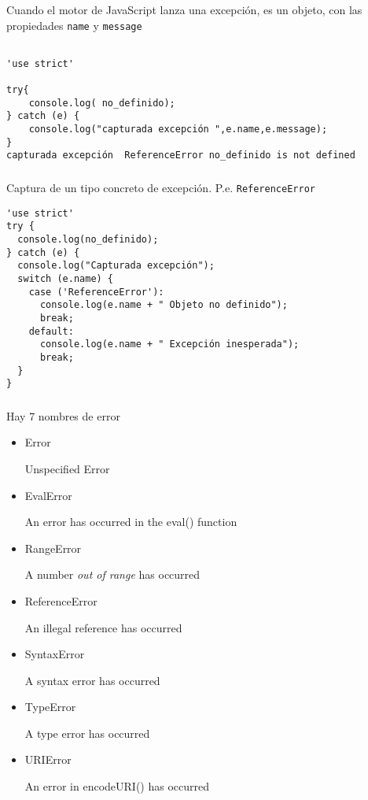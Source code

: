 \documentclass[ucs]{beamer}
\begin{document}
\begin{frame}[fragile]
\frametitle{}
Cuando el motor de JavaScript lanza una excepción, es un objeto,
con las propiedades 
\verb|name| y
\verb|message|

  \begin{scriptsize}
  \begin{verbatim}

'use strict'

try{
    console.log( no_definido);
} catch (e) {
    console.log("capturada excepción ",e.name,e.message);
}
capturada excepción  ReferenceError no_definido is not defined
  \end{verbatim}
  \end{scriptsize}

\end{frame}

\begin{frame}[fragile]
\frametitle{}

Captura de un tipo concreto de excepción. P.e. \verb|ReferenceError|
  \begin{scriptsize}
  \begin{verbatim}
'use strict'
try {
  console.log(no_definido);
} catch (e) {
  console.log("Capturada excepción");
  switch (e.name) {
    case ('ReferenceError'):
      console.log(e.name + " Objeto no definido");
      break;
    default:
      console.log(e.name + " Excepción inesperada");
      break;
  }
}
  \end{verbatim}
  \end{scriptsize}
\end{frame}

\begin{frame}[fragile]
\frametitle{}
Hay 7 nombres de error
    \begin{itemize}
    \item
Error

Unspecified Error
    \item
EvalError	

An error has occurred in the eval() function
    \item
RangeError

A number \emph{out of range} has occurred
    \item
ReferenceError

An illegal reference has occurred
    \item
SyntaxError	

A syntax error has occurred
    \item
TypeError	

A type error has occurred
    \item
URIError

An error in encodeURI() has occurred
    \end{itemize}

\end{frame}
\end{document}
